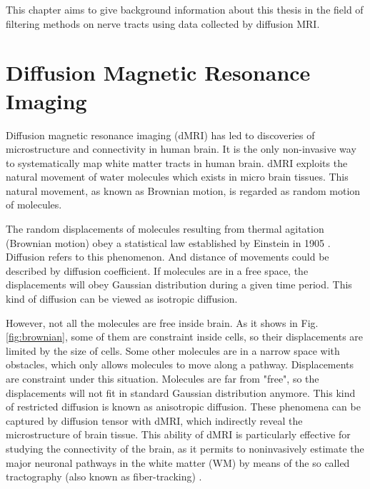 This chapter aims to give background information about this thesis in the field
of filtering methods on nerve tracts using data collected by diffusion MRI. 


\section{Diffusion Magnetic Resonance Imaging}

Diffusion magnetic resonance imaging (dMRI) has led to discoveries of microstructure and connectivity in human brain.
It is the only non-invasive way to 
systematically map white matter tracts in human brain.
dMRI exploits the natural movement of water molecules 
which exists in micro brain tissues. 
This natural movement, as known as Brownian motion, 
is regarded as random motion of molecules. 

The random displacements of molecules 
resulting from thermal agitation (Brownian motion) 
obey a statistical law established by Einstein in 1905 \cite*{lebihanLookingFunctionalArchitecture2003}.
Diffusion refers to this phenomenon.
And distance of movements could be described by diffusion coefficient.
If molecules are in a free space, the displacements will obey Gaussian distribution
during a given time period. This kind of diffusion can be viewed as isotropic diffusion.

However, not all the molecules are free inside brain. As it shows in Fig. \ref{fig:brownian},
some of them are constraint inside cells, so their displacements are limited by the size of cells. 
Some other molecules are in a narrow space with obstacles, which only allows molecules
to move along a pathway. Displacements are constraint under this situation.
Molecules are far from "free", so the displacements will not fit in standard Gaussian distribution anymore.
This kind of restricted diffusion is known as anisotropic diffusion.
These phenomena can be captured by diffusion tensor with dMRI, which indirectly reveal the microstructure of brain tissue.
This ability of dMRI is particularly effective for studying the connectivity of the brain,
as it permits to noninvasively estimate the major neuronal pathways in the white matter (WM) 
by means of the so called tractography (also known as fiber-tracking) \cite*{daducciCOMMITConvexOptimization2015}.


